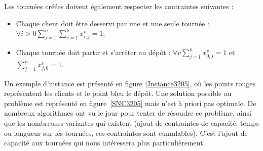 \documentclass[a4paper,11pt]{article}%
\begin{document}
Les tournées créées doivent également respecter les contraintes suivantes :

\begin{itemize}
\item Chaque client doit être desservi par une et une seule tournée : $\forall i > 0 \sum_{j = 1}^{n} \sum_{v = 1}^{k} x_{i,j}^v = 1$;
\item Chaque tournée doit partir et s'arrêter au dépôt : $\forall v \sum_{j = 1}^{n} x_{0,j}^v = 1$ et $\sum_{j = 1}^{n} x_{j,0}^v = 1 $.
\end{itemize}

Un exemple d'instance est présenté en figure~\ref{Instance3205}, où les points rouges représentent les clients et le point bleu le dépôt. Une solution possible au problème est représenté en figure~\ref{SNC3205} mais n'est à priori pas optimale. 
De nombreux algorithmes ont vu le jour pour tenter de résoudre ce problème, ainsi que les nombreuses variantes qui existent (ajout de contraintes de capacité, temps ou longueur sur les tournées, ces contraintes sont cumulables). 
C'est l'ajout de capacité aux tournées qui nous intéressera plus particulièrement.
\end{document}
